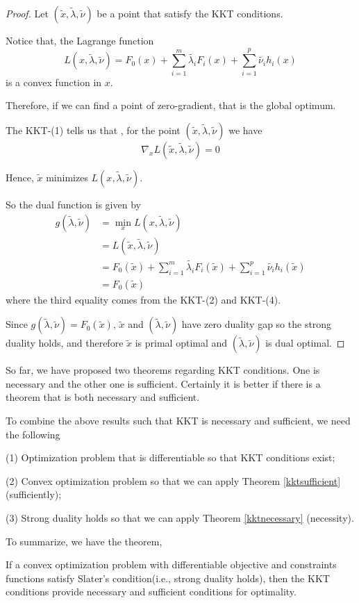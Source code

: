 \begin{proof}
	Let $(\tilde{x},\tilde{\lambda},\tilde{\nu})$ be a point that satisfy the KKT conditions. 
	
	Notice that, the Lagrange function
	$$L(x,\tilde{\lambda}, \tilde{\nu}) = F_0(x) + \sum^m_{i=1}\tilde{\lambda_i}F_i(x) + \sum^p_{i=1}\tilde{\nu_i}h_i(x)$$
	is a convex function in $x$. 
	
	Therefore, if we can find a point of zero-gradient, that is the global optimum.
	
	The KKT-(1) tells us that , for the point $(\tilde{x},\tilde{\lambda},\tilde{\nu})$ we have
	$$\nabla_xL(\tilde{x},\tilde{\lambda},\tilde{\nu}) = 0$$

	Hence, $\tilde{x}$ minimizes $L(x,\tilde{\lambda},\tilde{\nu})$. 
	
	So the dual function is given by	
	\begin{align*}
	g(\tilde{\lambda}, \tilde{\nu}) 
	&= \min_xL(x,\tilde{\lambda},\tilde{\nu})\\
	&= L(\tilde{x},\tilde{\lambda},\tilde{\nu})\\
	&= F_0(\tilde{x}) + \sum^m_{i=1}\tilde{\lambda_i}F_i(\tilde{x}) + \sum^p_{i=1}\tilde{\nu_i}h_i(\tilde{x})\\
	&= F_0(\tilde{x})
	\end{align*}
	where the third equality comes from the KKT-(2) and KKT-(4).
	
	Since $g(\tilde{\lambda},\tilde{\nu}) = F_0(\tilde{x})$, $\tilde{x}$ and $(\tilde{\lambda},\tilde{\nu})$ have zero duality gap so the strong duality holds, and therefore $\tilde{x}$ is primal optimal and $(\tilde{\lambda},\tilde{\nu})$ is dual optimal.
\end{proof}
So far, we have proposed two theorems regarding KKT conditions. One is necessary and the other one is sufficient. Certainly it is better if there is a theorem that is both necessary and sufficient.

To combine the above results such that KKT is necessary and sufficient, we need the following

	(1) Optimization problem that is differentiable so that KKT conditions exist;
	
	(2) Convex optimization problem so that we can apply Theorem \ref{kktsufficient} (sufficiently);
	
	(3) Strong duality holds so that we can apply Theorem \ref{kktnecessary} (necessity).

To summarize, we have the theorem,
\begin{theorem}
If a convex optimization problem with differentiable objective and constraints functions satisfy Slater's condition(i.e., strong duality holds), then the KKT conditions provide necessary and sufficient conditions for optimality. 
\end{theorem}

